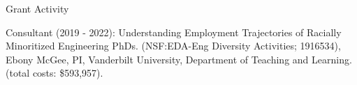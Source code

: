 \begin{rSection}{\textrm{Grant Activity}}%
\begin{etaremune}

\item Consultant (2019 - 2022): Understanding Employment Trajectories of Racially Minoritized Engineering PhDs. (NSF:EDA-Eng Diversity Activities; 1916534),
Ebony McGee, PI, Vanderbilt University, Department of Teaching and Learning.  (total costs: \$593,957).
\end{etaremune}\end{rSection}

